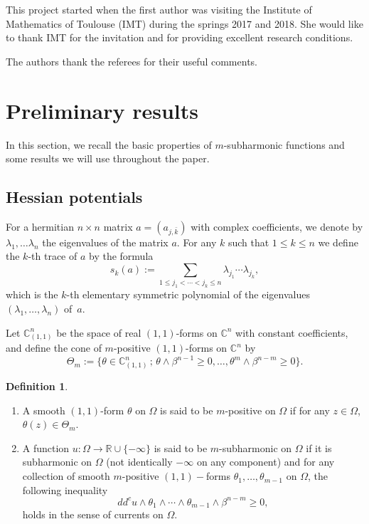 \documentclass[JEP,XML,SOM,Unicode]{cedram}
\newcommand{\sep}{\,;\,}
\theoremstyle{definition}
\newtheorem{definition}[theorem]{Definition}
\newcommand{\R}{\mathbb{R}}
\renewcommand{\C}{\mathbb{C}}
\begin{document}
This project started when the first author was visiting the Institute of Mathematics of Toulouse (IMT) during the springs 2017 and 2018. She would like to thank IMT for the invitation and for providing excellent research conditions.

The authors thank the referees for their useful comments.

\section{Preliminary results}\label{sec:2}
In this section, we recall the basic properties of $m$-subharmonic functions and some results we will use throughout the paper.

\subsection{Hessian potentials}
For a hermitian $n \times n$ matrix $a = (a_{j,\bar k})$ with complex coefficients, we denote by $\lambda_1,\dots \lambda_n$ the eigenvalues of the matrix $a$. For any $k$ such that $1 \leq k \leq n$ we define the $k$-th trace of $a$ by the formula
\[
s_k (a):= \sum_{1 \leq j_1 < \cdots < j_k \leq n} \lambda_{j_1} \cdots \lambda_{j_k},
\]
which is the $k$-th elementary symmetric polynomial of the eigenvalues $(\lambda_1,\dots, \lambda_n)$ of~$a$.

Let $\C^n_{(1,1)} $ be the space of real $(1, 1)$-forms on $\C^n$ with constant
coefficients, and define the cone of $m$-positive $(1,1)$-forms on $\C^n$ by
\begin{equation}\label{eq:mpositive}
\Theta_m:= \{\theta \in \C^n_{(1,1)} \sep \theta \wedge \beta^{n - 1} \geq 0,\dots, \theta^m \wedge \beta^{n - m} \geq 0\}.
\end{equation}

\skpt
\begin{definition} \label{def:mpositive}
\begin{enumerate}
\item
A smooth $(1,1)$-form $\theta$ on $\Omega$ is said to be $m$-positive on $\Omega$ if for any $z \in \Omega$, $\theta (z) \in \Theta_m$.

\item
A function $u:\Omega \to \R\cup\{-\infty\}$ is said to be $m$-subharmonic on $\Omega$ if it is subharmonic on $\Omega$ (not identically $-\infty$ on any component) and for any collection of smooth $m$-positive $(1,1)-$forms $\theta_1,\dots,\theta_{m-1}$ on $\Omega$, the following inequality
\[
dd^c u\wedge \theta_1\wedge\cdots\wedge\theta_{m-1} \wedge \beta^{n-m}\geq 0,
\]
holds in the sense of currents on $\Omega$.
\end{enumerate}
\end{definition}
\end{document}
